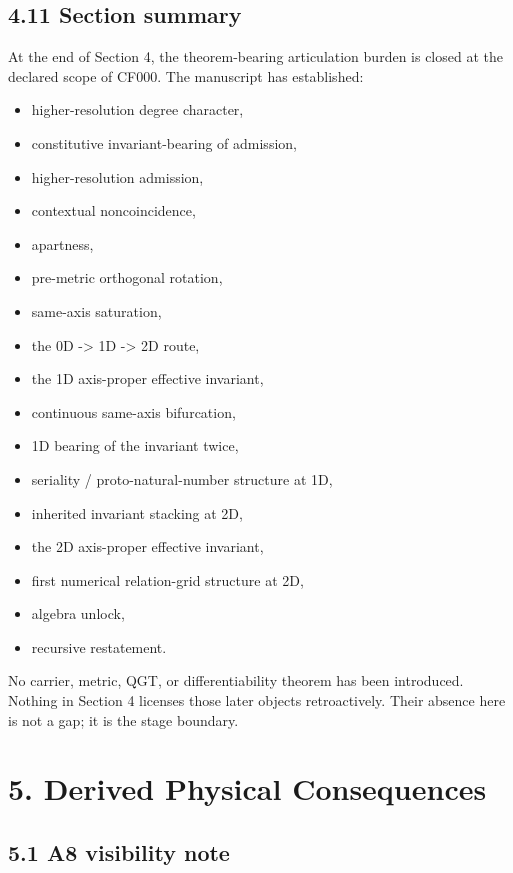 \documentclass[11pt]{article}
\begin{document}
\subsection{4.11 Section summary}\label{section-summary-1}

At the end of Section 4, the theorem-bearing articulation burden is closed at the declared scope of CF000. The manuscript has established:

\begin{itemize}
\item
  higher-resolution degree character,
\item
  constitutive invariant-bearing of admission,
\item
  higher-resolution admission,
\item
  contextual noncoincidence,
\item
  apartness,
\item
  pre-metric orthogonal rotation,
\item
  same-axis saturation,
\item
  the 0D -\textgreater{} 1D -\textgreater{} 2D route,
\item
  the 1D axis-proper effective invariant,
\item
  continuous same-axis bifurcation,
\item
  1D bearing of the invariant twice,
\item
  seriality / proto-natural-number structure at 1D,
\item
  inherited invariant stacking at 2D,
\item
  the 2D axis-proper effective invariant,
\item
  first numerical relation-grid structure at 2D,
\item
  algebra unlock,
\item
  recursive restatement.
\end{itemize}

No carrier, metric, QGT, or differentiability theorem has been introduced. Nothing in Section 4 licenses those later objects retroactively. Their absence here is not a gap; it is the stage boundary.

\section{5. Derived Physical Consequences}\label{derived-physical-consequences}

\subsection{5.1 A8 visibility note}\label{a8-visibility-note}
\end{document}
